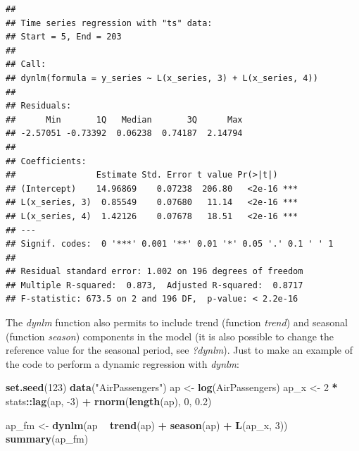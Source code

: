 \documentclass[
]{article}
\newenvironment{Shaded}{\begin{snugshade}}{\end{snugshade}}
\newcommand{\DecValTok}[1]{\textcolor[rgb]{0.00,0.00,0.81}{#1}}
\newcommand{\FloatTok}[1]{\textcolor[rgb]{0.00,0.00,0.81}{#1}}
\newcommand{\KeywordTok}[1]{\textcolor[rgb]{0.13,0.29,0.53}{\textbf{#1}}}
\newcommand{\NormalTok}[1]{#1}
\newcommand{\OperatorTok}[1]{\textcolor[rgb]{0.81,0.36,0.00}{\textbf{#1}}}
\newcommand{\StringTok}[1]{\textcolor[rgb]{0.31,0.60,0.02}{#1}}
\begin{document}
\begin{verbatim}
## 
## Time series regression with "ts" data:
## Start = 5, End = 203
## 
## Call:
## dynlm(formula = y_series ~ L(x_series, 3) + L(x_series, 4))
## 
## Residuals:
##      Min       1Q   Median       3Q      Max 
## -2.57051 -0.73392  0.06238  0.74187  2.14794 
## 
## Coefficients:
##                Estimate Std. Error t value Pr(>|t|)    
## (Intercept)    14.96869    0.07238  206.80   <2e-16 ***
## L(x_series, 3)  0.85549    0.07680   11.14   <2e-16 ***
## L(x_series, 4)  1.42126    0.07678   18.51   <2e-16 ***
## ---
## Signif. codes:  0 '***' 0.001 '**' 0.01 '*' 0.05 '.' 0.1 ' ' 1
## 
## Residual standard error: 1.002 on 196 degrees of freedom
## Multiple R-squared:  0.873,  Adjusted R-squared:  0.8717 
## F-statistic: 673.5 on 2 and 196 DF,  p-value: < 2.2e-16
\end{verbatim}

The \emph{dynlm} function also permits to include trend (function \emph{trend}) and seasonal (function \emph{season}) components in the model (it is also possible to change the reference value for the seasonal period, see \emph{?dynlm}). Just to make an example of the code to perform a dynamic regression with \emph{dynlm}:

\begin{Shaded}
\begin{Highlighting}[]
\KeywordTok{set.seed}\NormalTok{(}\DecValTok{123}\NormalTok{)}
\KeywordTok{data}\NormalTok{(}\StringTok{"AirPassengers"}\NormalTok{)}
\NormalTok{ap <-}\StringTok{ }\KeywordTok{log}\NormalTok{(AirPassengers)}
\NormalTok{ap_x <-}\StringTok{ }\DecValTok{2} \OperatorTok{*}\StringTok{ }\NormalTok{stats}\OperatorTok{::}\KeywordTok{lag}\NormalTok{(ap, }\DecValTok{-3}\NormalTok{) }\OperatorTok{+}\StringTok{ }\KeywordTok{rnorm}\NormalTok{(}\KeywordTok{length}\NormalTok{(ap), }\DecValTok{0}\NormalTok{, }\FloatTok{0.2}\NormalTok{)}

\NormalTok{ap_fm <-}\StringTok{ }\KeywordTok{dynlm}\NormalTok{(ap }\OperatorTok{~}\StringTok{ }\KeywordTok{trend}\NormalTok{(ap) }\OperatorTok{+}\StringTok{ }\KeywordTok{season}\NormalTok{(ap) }\OperatorTok{+}\StringTok{ }\KeywordTok{L}\NormalTok{(ap_x, }\DecValTok{3}\NormalTok{))}
\KeywordTok{summary}\NormalTok{(ap_fm)}
\end{Highlighting}
\end{Shaded}
\end{document}
